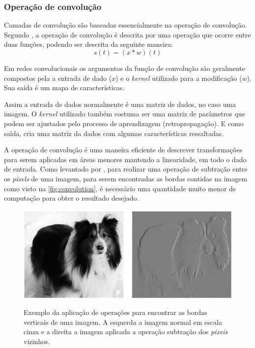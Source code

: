 \subsubsection{Operação de convolução}
Camadas de convolução são baseadas essencialmente na operação de convolução. Segundo \cite{Goodfellow-et-al-2016}, a operação de convolução é descrita por uma operação que ocorre entre duas funções, podendo ser descrita da seguinte maneira:\[s(t) = (x*w)(t)\] %


Em redes convolucionais os argumentos da função de convolução são geralmente compostos pela a entrada de dado ($x$) e o \textit{kernel} utilizado para a modificação ($w$). Sua saída é um mapa de características.

\par Assim a entrada de dados normalmente é uma matriz de dados, no caso uma imagem. O \textit{kernel} utilizado também costuma ser uma matriz de parâmetros que podem ser ajustados pelo processo de aprendizagem (retropropagação). E como saída, cria uma matriz da dados com algumas características ressaltadas.

\par A operação de convolução é uma maneira eficiente de descrever transformações para serem aplicadas em áreas menores mantendo a linearidade, em todo o dado de entrada. Como levantado por , para realizar uma operação de subtração entre os \textit{pixels} de uma imagem, para serem encontradas as bordas contidas na imagem como visto na \autoref{fig:convolution}, é necessário uma quantidade muito menor de computação para obter o resultado desejado.

\begin{figure}[H]
  \centering
  \caption{Exemplo da aplicação de operações para encontrar as bordas verticais de uma imagem. A esquerda a imagem normal em escala cinza e a direita a imagem aplicada a operação subtração dos \textit{pixeis} vizinhos.}
  \includegraphics[width=400pt]{dados/figuras/convolution}
  \label{fig:convolution}
\end{figure}


